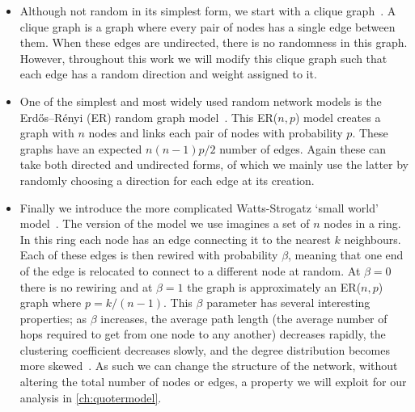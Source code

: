 \begin{itemize}
	\item Although not random in its simplest form, we start with a clique graph~\cite{newman_networks_2018}. A clique graph is a graph where every pair of nodes has a single edge between them. When these edges are undirected, there is no randomness in this graph. However, throughout this work we will modify this clique graph such that each edge has a random direction and weight assigned to it. 
	\item One of the simplest and most widely used random network models is the Erdős–Rényi (ER) random graph model~\cite{erdos_evolution_1960,gilbert_random_1959}. This ER($n,p$) model creates a graph with $n$ nodes and links each pair of nodes with probability $p$. These graphs have an expected $n(n-1)p/2$ number of edges. Again these can take both directed and undirected forms, of which we mainly use the latter by randomly choosing a direction for each edge at its creation.
	\item Finally we introduce the more complicated Watts-Strogatz `small world' model~\cite{watts_collective_1998}. The version of the model we use imagines a set of $n$ nodes in a ring. In this ring each node has an edge connecting it to the nearest $k$ neighbours. Each of these edges is then rewired with probability $\beta$, meaning that one end of the edge is relocated to connect to a different node at random. At $\beta=0$ there is no rewiring and at $\beta=1$ the graph is approximately an ER($n,p$) graph where $p=k/(n-1)$. This $\beta$ parameter has several interesting properties; as $\beta$ increases, the average path length (the average number of hops required to get from one node to any another) decreases rapidly, the clustering coefficient decreases slowly, and the degree distribution becomes more skewed~\cite{watts_collective_1998}. As such we can change the structure of the network, without altering the total number of nodes or edges, a property we will exploit for our analysis in \autoref{ch:quotermodel}.
\end{itemize}

